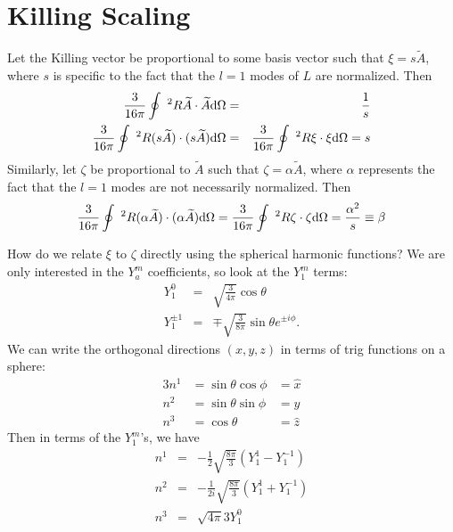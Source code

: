 \documentclass[11pt]{article}
\begin{document}
\section{Killing Scaling}
Let the Killing vector be proportional to some basis vector such that $\xi = s \widetilde{A}$, where $s$ is specific to the fact that the $l=1$ modes of $L$ are normalized.  Then
\begin{eqnarray}
\frac{3}{16 \pi} \oint ~^2R \widetilde{A} \cdot \widetilde{A} {\rm d \Omega} &=& \frac{1}{s} \\
\frac{3}{16 \pi} \oint ~^2R (s \widetilde{A}) \cdot (s \widetilde{A}) {\rm d \Omega} &=& 
\frac{3}{16 \pi} \oint ~^2R \xi \cdot \xi {\rm d \Omega} = s 
\end{eqnarray}
Similarly, let $\zeta$ be proportional to $\widetilde{A}$ such that $\zeta = \alpha \widetilde{A}$, where $\alpha$ represents the fact that the $l=1$ modes are not necessarily normalized.  Then
\begin{equation}
\frac{3}{16 \pi} \oint ~^2R (\alpha \widetilde{A}) \cdot (\alpha \widetilde{A}) {\rm d \Omega} = 
\frac{3}{16 \pi} \oint ~^2R \zeta \cdot \zeta {\rm d \Omega} = \frac{\alpha^2}{s} \equiv \beta
\end{equation}

\noindent
How do we relate $\xi$ to $\zeta$ directly using the spherical harmonic functions?  We are only interested in the $Y_a^m$ coefficients, so look at the $Y_1^m$ terms:
\begin{eqnarray}
Y_1^0 &=& \sqrt{\frac{3}{4 \pi}} \cos \theta \\
Y_1^{\pm 1} &=& \mp \sqrt{\frac{3}{8 \pi}} \sin \theta e^{\pm i \phi}.
\end{eqnarray}
We can write the orthogonal directions $(x,y,z)$ in terms of trig functions on a sphere:
\begin{alignat*}{3}
n^1 &= \sin \theta \cos \phi &= \hat{x} \\
n^2 &= \sin \theta \sin \phi &= \hat{y}\\
n^3 &= \cos \theta &= \hat{z}
\end{alignat*}
Then in terms of the $Y_1^m$'s, we have
\begin{eqnarray}
n^1 &=& -\frac{1}{2} \sqrt{\frac{8 \pi}{3}} \left( Y_1^1 - Y_1^{-1} \right) \\
n^2 &=& -\frac{1}{2i} \sqrt{\frac{8 \pi}{3}} \left( Y_1^1 + Y_1^{-1} \right) \\
n^3 &=& \sqrt{4 \pi}{3}  Y_1^0
\end{eqnarray}
\end{document}
